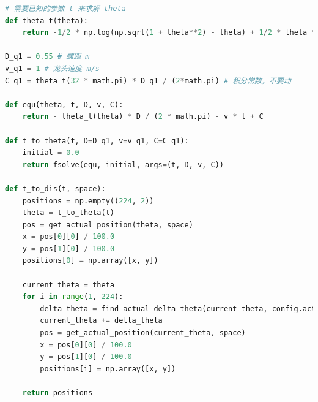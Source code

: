 \documentclass[a4paper]{article}
\begin{document}
\begin{lstlisting}[language=python,columns=fullflexible,frame=shadowbox]
# 需要已知的参数 t 来求解 theta
def theta_t(theta):
    return -1/2 * np.log(np.sqrt(1 + theta**2) - theta) + 1/2 * theta * np.sqrt(theta ** 2 + 1)

D_q1 = 0.55 # 螺距 m
v_q1 = 1 # 龙头速度 m/s
C_q1 = theta_t(32 * math.pi) * D_q1 / (2*math.pi) # 积分常数，不要动

def equ(theta, t, D, v, C):
    return - theta_t(theta) * D / (2 * math.pi) - v * t + C

def t_to_theta(t, D=D_q1, v=v_q1, C=C_q1):
    initial = 0.0
    return fsolve(equ, initial, args=(t, D, v, C))

def t_to_dis(t, space):
    positions = np.empty((224, 2))
    theta = t_to_theta(t)
    pos = get_actual_position(theta, space)
    x = pos[0][0] / 100.0
    y = pos[1][0] / 100.0
    positions[0] = np.array([x, y])

    current_theta = theta
    for i in range(1, 224):
        delta_theta = find_actual_delta_theta(current_theta, config.actual_fixed_distances[0 if i == 1 else 1], space)
        current_theta += delta_theta
        pos = get_actual_position(current_theta, space)
        x = pos[0][0] / 100.0
        y = pos[1][0] / 100.0
        positions[i] = np.array([x, y])

    return positions
	\end{lstlisting}
 	
\end{document}
